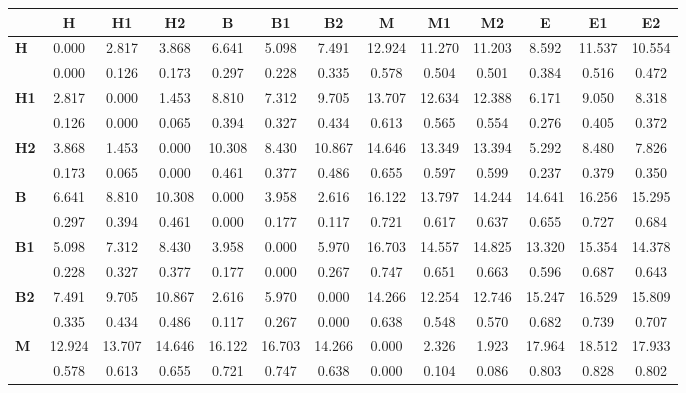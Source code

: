 \begin{table*}[h!]
\begin{center}
\begin{tabular}{| l || c | c | c || c | c | c || c | c | c || c | c | c |}\hline
 & {\bf H} & {\bf H1} & {\bf H2} & {\bf B} & {\bf B1} & {\bf B2} & {\bf M} & {\bf M1} & {\bf M2} & {\bf E} & {\bf E1} & {\bf E2} \\\hline\hline
{\bf H} & 0.000 & 2.817 & 3.868 & 6.641 & 5.098 & 7.491 & 12.924 & 11.270 & 11.203 & 8.592 & 11.537 & 10.554 \\
 & 0.000  & 0.126  & 0.173  & 0.297  & 0.228  & 0.335  & 0.578  & 0.504  & 0.501  & 0.384  & 0.516  & 0.472 \\\hline
{\bf H1} & 2.817 & 0.000 & 1.453 & 8.810 & 7.312 & 9.705 & 13.707 & 12.634 & 12.388 & 6.171 & 9.050 & 8.318 \\
 & 0.126  & 0.000  & 0.065  & 0.394  & 0.327  & 0.434  & 0.613  & 0.565  & 0.554  & 0.276  & 0.405  & 0.372 \\\hline
{\bf H2} & 3.868 & 1.453 & 0.000 & 10.308 & 8.430 & 10.867 & 14.646 & 13.349 & 13.394 & 5.292 & 8.480 & 7.826 \\
 & 0.173  & 0.065  & 0.000  & 0.461  & 0.377  & 0.486  & 0.655  & 0.597  & 0.599  & 0.237  & 0.379  & 0.350 \\\hline\hline
{\bf B} & 6.641 & 8.810 & 10.308 & 0.000 & 3.958 & 2.616 & 16.122 & 13.797 & 14.244 & 14.641 & 16.256 & 15.295 \\
 & 0.297  & 0.394  & 0.461  & 0.000  & 0.177  & 0.117  & 0.721  & 0.617  & 0.637  & 0.655  & 0.727  & 0.684 \\\hline
{\bf B1} & 5.098 & 7.312 & 8.430 & 3.958 & 0.000 & 5.970 & 16.703 & 14.557 & 14.825 & 13.320 & 15.354 & 14.378 \\
 & 0.228  & 0.327  & 0.377  & 0.177  & 0.000  & 0.267  & 0.747  & 0.651  & 0.663  & 0.596  & 0.687  & 0.643 \\\hline
{\bf B2} & 7.491 & 9.705 & 10.867 & 2.616 & 5.970 & 0.000 & 14.266 & 12.254 & 12.746 & 15.247 & 16.529 & 15.809 \\
 & 0.335  & 0.434  & 0.486  & 0.117  & 0.267  & 0.000  & 0.638  & 0.548  & 0.570  & 0.682  & 0.739  & 0.707 \\\hline\hline
{\bf M} & 12.924 & 13.707 & 14.646 & 16.122 & 16.703 & 14.266 & 0.000 & 2.326 & 1.923 & 17.964 & 18.512 & 17.933 \\
 & 0.578  & 0.613  & 0.655  & 0.721  & 0.747  & 0.638  & 0.000  & 0.104  & 0.086  & 0.803  & 0.828  & 0.802 \\\hline

\end{tabular}
\end{center}
\end{table*}
